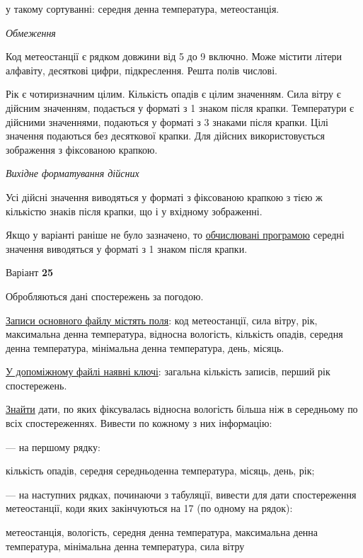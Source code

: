 \documentclass[11pt, ukrainian]{article}
\begin{document}
{\noindent}у такому сортуванні: середня денна температура, метеостанція.


\bigskip\textit{Обмеження}

Код метеостанції є рядком довжини від 5 до 9 включно.
Може містити літери алфавіту, десяткові цифри, підкреслення. Решта полів числові.

Рік є чотиризначним цілим.
Кількість опадів є цілим значенням.
Сила вітру є дійсним значенням, подається у форматі з 1 знаком після крапки.
Температури є дійсними значеннями, подаються у форматі з 3 знаками після крапки.
Цілі значення подаються без десяткової крапки.
Для дійсних використовується зображення з фіксованою крапкою.

\textit{Вихідне форматування дійсних}

Усі дійсні значення виводяться у форматі з фіксованою крапкою з тією ж кількістю знаків після крапки, що і у вхідному зображенні.

Якщо у варіанті раніше не було зазначено, то \underline{обчислювані програмою} середні значення виводяться у форматі з 1 знаком після крапки.


\par
\newpage
{\center Варіант  \No \textbf { 25 }\par}
\bigskip
Обробляються дані спостережень за погодою. 

\underline{Записи основного файлу містять поля}: код метеостанції, сила вітру, рік, максимальна денна температура, відносна вологість, кількість опадів, середня денна температура, мінімальна денна температура, день, місяць.

\underline{У допоміжному файлі наявні ключі}: загальна кількість записів, перший рік спостережень.

\underline{Знайти} дати, по яких фіксувалась відносна вологість більша ніж в середньому по всіх спостереженнях. Вивести по кожному з них інформацію:\par
{\noindent}--- на першому рядку:\par
кількість опадів, середня середньоденна температура, місяць, день, рік;

{\noindent}--- на наступних рядках, починаючи з табуляції, вивести для дати спостереження метеостанції, коди яких закінчуються на 17 (по одному на рядок):\par
метеостанція, вологість, середня денна температура, максимальна денна температура, мінімальна денна температура, сила вітру
\end{document}
